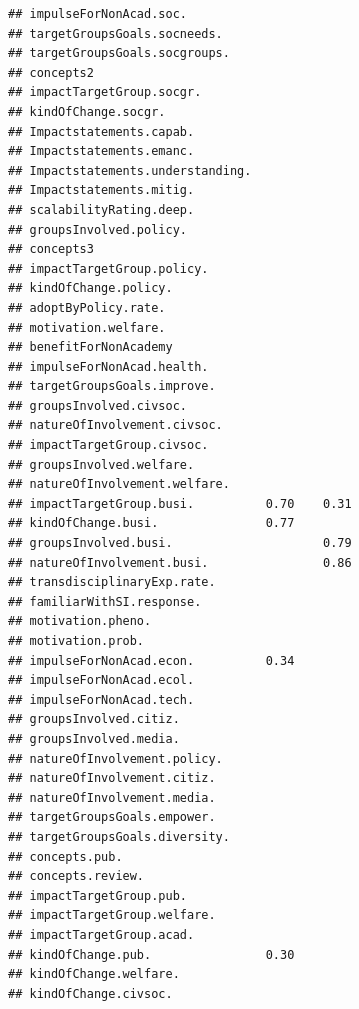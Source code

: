 \documentclass[
]{article}
\begin{document}
\begin{verbatim}
## impulseForNonAcad.soc.                         
## targetGroupsGoals.socneeds.                    
## targetGroupsGoals.socgroups.                   
## concepts2                                      
## impactTargetGroup.socgr.                       
## kindOfChange.socgr.                            
## Impactstatements.capab.                        
## Impactstatements.emanc.                        
## Impactstatements.understanding.                
## Impactstatements.mitig.                        
## scalabilityRating.deep.                        
## groupsInvolved.policy.                         
## concepts3                                      
## impactTargetGroup.policy.                      
## kindOfChange.policy.                           
## adoptByPolicy.rate.                            
## motivation.welfare.                            
## benefitForNonAcademy                           
## impulseForNonAcad.health.                      
## targetGroupsGoals.improve.                     
## groupsInvolved.civsoc.                         
## natureOfInvolvement.civsoc.                    
## impactTargetGroup.civsoc.                      
## groupsInvolved.welfare.                        
## natureOfInvolvement.welfare.                   
## impactTargetGroup.busi.          0.70    0.31  
## kindOfChange.busi.               0.77          
## groupsInvolved.busi.                     0.79  
## natureOfInvolvement.busi.                0.86  
## transdisciplinaryExp.rate.                     
## familiarWithSI.response.                       
## motivation.pheno.                              
## motivation.prob.                               
## impulseForNonAcad.econ.          0.34          
## impulseForNonAcad.ecol.                        
## impulseForNonAcad.tech.                        
## groupsInvolved.citiz.                          
## groupsInvolved.media.                          
## natureOfInvolvement.policy.                    
## natureOfInvolvement.citiz.                     
## natureOfInvolvement.media.                     
## targetGroupsGoals.empower.                     
## targetGroupsGoals.diversity.                   
## concepts.pub.                                  
## concepts.review.                               
## impactTargetGroup.pub.                         
## impactTargetGroup.welfare.                     
## impactTargetGroup.acad.                        
## kindOfChange.pub.                0.30          
## kindOfChange.welfare.                          
## kindOfChange.civsoc.                           

\end{verbatim}
\end{document}
